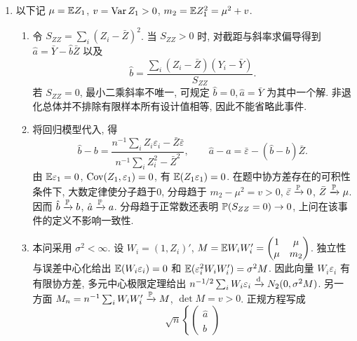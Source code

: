 \begin{solution}
\begin{enumerate}[label=\arabic*.]
\begin{enumerate}[label=\alph*)]
$\hat\sigma_{\rm ML}^2=\operatorname{RSS}/n$, 因为导数 $(-nv+\operatorname{RSS})/(2v^2)$ 在该点前正后负. 给定满秩设计且 $n>p$, 非退化正态误差使 $\operatorname{RSS}>0$ 几乎处处. 当 $n=p$ 且 $X$ 可逆时, 可以完全插值, $\operatorname{RSS}=0$; 在参数域 $v>0$ 中似然随 $v\downarrow0$ 无界, 不存在有限方差极大似然估计. 所以公式中的零只能是边界形式, 不能称为参数域内的极大点.
\item 本问须 $n>p$. 令 $P=X(X'X)^{-1}X'$, 它是秩 $p$ 的正交投影, 残差为 $(I-P)\varepsilon$. 给定 $X$, 用正交基对角化 $I-P$, 它有 $n-p$ 个特征值1及 $p$ 个特征值0. 旋转后的标准化误差仍由独立标准正态坐标组成, 故
\[
\operatorname{RSS}/\sigma^2\mid X\sim\chi^2_{n-p}.
\]
取 $\hat\sigma^2=\operatorname{RSS}/(n-p)$, 得条件期望 $\sigma^2$, 所以也无条件无偏, 且所问比值条件服从 $\chi^2_{n-p}$. 此处条件二次型的期望固定且有限, 不存在上一问的逆矩阵可积性障碍.
\end{enumerate}
\item 以下记 $\mu=\mathbb E Z_1$, $v=\operatorname{Var} Z_1>0$, $m_2=\mathbb E Z_1^2=\mu^2+v$.
\begin{enumerate}[label=\alph*)]
\item 令 $S_{ZZ}=\sum_i(Z_i-\bar Z)^2$. 当 $S_{ZZ}>0$ 时, 对截距与斜率求偏导得到 $\hat a=\bar Y-\hat b\bar Z$ 以及
\[
\hat b=\frac{\sum_i(Z_i-\bar Z)(Y_i-\bar Y)}{S_{ZZ}}.
\]
若 $S_{ZZ}=0$, 最小二乘斜率不唯一, 可规定 $\hat b=0,\hat a=\bar Y$ 为其中一个解. 非退化总体并不排除有限样本所有设计值相等, 因此不能省略此事件.
\item 将回归模型代入, 得
\[
\hat b-b=
\frac{n^{-1}\sum_i Z_i\varepsilon_i-\bar Z\bar\varepsilon}
 {n^{-1}\sum_iZ_i^2-\bar Z^2},\qquad
\hat a-a=\bar\varepsilon-(\hat b-b)\bar Z.
\]
由 $\mathbb E\varepsilon_1=0$, $\operatorname{Cov}(Z_1,\varepsilon_1)=0$, 有 $\mathbb E(Z_1\varepsilon_1)=0$. 在题中协方差存在的可积性条件下, 大数定律使分子趋于0, 分母趋于 $m_2-\mu^2=v>0$, $\bar\varepsilon\xrightarrow{\mathbb P}0$, $\bar Z\xrightarrow{\mathbb P}\mu$. 因而 $\hat b\xrightarrow{\mathbb P} b$, $\hat a\xrightarrow{\mathbb P} a$. 分母趋于正常数还表明 $\mathbb P(S_{ZZ}=0)\to0$, 上问在该事件的定义不影响一致性.
\item 本问采用 $\sigma^2<\infty$. 设 $W_i=(1,Z_i)'$, $M=\mathbb E W_iW_i'=\begin{pmatrix}1&\mu\\\mu&m_2\end{pmatrix}$. 独立性与误差中心化给出 $\mathbb E(W_i\varepsilon_i)=0$ 和
$\mathbb E(\varepsilon_i^2W_iW_i')=\sigma^2M$.
因此向量 $W_i\varepsilon_i$ 有有限协方差, 多元中心极限定理给出 $n^{-1/2}\sum_iW_i\varepsilon_i\xrightarrow{\mathrm d} N_2(0,\sigma^2M)$. 另一方面 $M_n=n^{-1}\sum_iW_iW_i'\xrightarrow{\mathbb P} M$, $\det M=v>0$. 正规方程写成
\[
\sqrt n\left\{\begin{pmatrix}\hat a\\\hat b\end{pmatrix}
\]
\end{enumerate}
\end{enumerate}
\end{solution}
